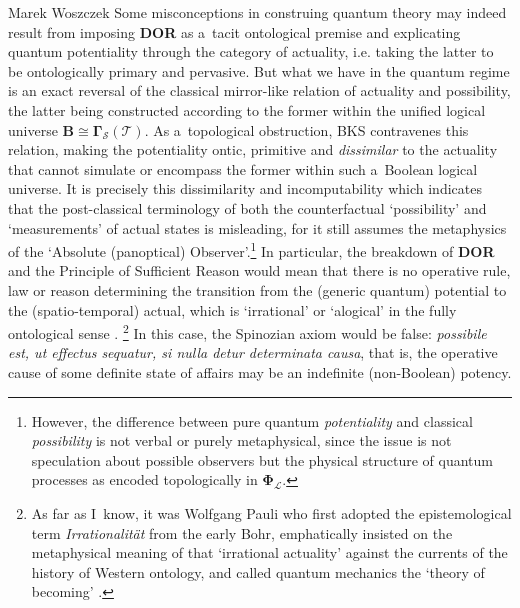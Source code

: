 \begin{artengenv}{Marek Woszczek}
Some misconceptions in construing quantum theory may indeed result from imposing \textbf{DOR} as a~tacit ontological premise and explicating quantum potentiality through the category of actuality, i.e. taking the latter to be ontologically primary and pervasive. But what we have in the quantum regime is an exact reversal of the classical mirror-like relation of actuality and possibility, the latter being constructed according to the former within the unified logical universe $\bm{B \cong \Gamma}_{\mathcal{S}}(\mathcal{T})$. As a~topological obstruction, BKS contravenes this relation, making the potentiality ontic, primitive and \textit{dissimilar} to the actuality that cannot simulate or encompass the former within such a~Boolean logical universe. It is precisely this dissimilarity and incomputability which indicates that the post-classical terminology of both the counterfactual ‘possibility' and ‘measurements' of actual states is misleading, for it still assumes the metaphysics of the ‘Absolute (panoptical) Observer'.\footnote{However, the difference between pure quantum \textit{potentiality} and classical \textit{possibility} is not verbal or purely metaphysical, since the issue is not speculation about possible observers but the physical structure of quantum processes as encoded topologically in $\bm{\Phi}_\mathcal{L}$.} In particular, the breakdown of \textbf{DOR} and the Principle of Sufficient Reason would mean that there is no operative rule, law or reason determining the transition from the (generic quantum) potential to the (spatio-temporal) actual, which is ‘irrational' or ‘alogical' in the fully ontological sense %
\parencite[cf. e.g.][]{bub_quantum_2014}.%
\footnote{As far as I~know, it was Wolfgang Pauli who first adopted the epistemological term \textit{Irrationalität} from the early Bohr, emphatically insisted on the metaphysical meaning of that ‘irrational actuality' against the currents of the history of Western ontology, and called quantum mechanics the ‘theory of becoming' 
\parencite[see e.g.][]{pauli_probability_1994}.%
} In this case, the Spinozian axiom would be false: \textit{possibile est, ut effectus sequatur, si nulla detur determinata causa}, that is, the operative cause of some definite state of affairs may be an indefinite (non-Boolean) potency.


\end{artengenv}
